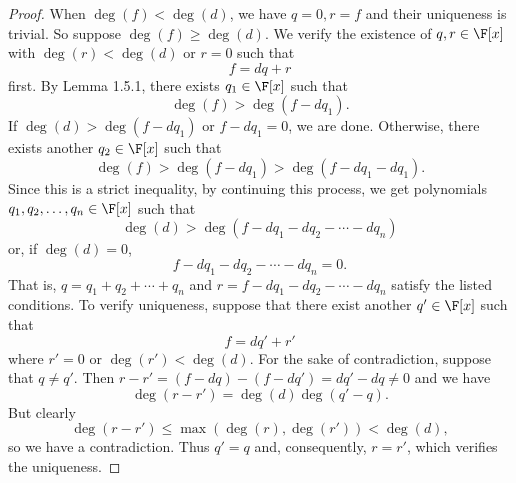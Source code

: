 \documentclass[linearalgebraII]{subfiles}
\begin{document}
    \begin{proof}
        When $\deg(f) < \deg(d)$, we have $q=0, r=f$ and their uniqueness is trivial. So suppose $\deg(f)\geq\deg(d)$. We verify the existence of $q, r\in \F[x]$ with $\deg(r)<\deg(d)$ or $r=0$ such that
        \begin{equation*}
            f = dq+r
        \end{equation*}
        first. By Lemma 1.5.1, there exists $q_1\in \F[x]$ such that
        \begin{equation*}
            \deg(f) > \deg(f-dq_1).
        \end{equation*}
        If $\deg(d) > \deg(f-dq_1)$ or $f-dq_1 = 0$, we are done. Otherwise, there exists another $q_2\in \F[x]$ such that
        \begin{equation*}
            \deg(f) > \deg(f-dq_1) > \deg(f-dq_1-dq_1).
        \end{equation*}
        Since this is a strict inequality, by continuing this process, we get polynomials $q_1, q_2, \ldots, q_n\in \F[x]$ such that
        \begin{equation*}
            \deg(d) > \deg(f-dq_1-dq_2-\cdots-dq_n)
        \end{equation*}
        or, if $\deg(d) = 0$,
        \begin{equation*}
            f - dq_1 - dq_2 - \cdots - dq_n = 0.
        \end{equation*}
        That is, $q = q_1+q_2+\cdots+q_n$ and $r = f-dq_1-dq_2-\cdots-dq_n$ satisfy the listed conditions. To verify uniqueness, suppose that there exist another $q'\in \F[x]$ such that
        \begin{equation*}
            f = dq'+r'
        \end{equation*}
        where $r' = 0$ or $\deg(r')<\deg(d)$. For the sake of contradiction, suppose that $q\neq q'$. Then $r-r' = (f-dq)-(f-dq') = dq'-dq \neq 0$ and we have
        \begin{equation*}
            \deg(r-r') = \deg(d)\deg(q'-q).
        \end{equation*}
        But clearly
        \begin{equation*}
            \deg(r-r') \leq \max(\deg(r), \deg(r')) < \deg(d),
        \end{equation*}
        so we have a contradiction. Thus $q'=q$ and, consequently, $r=r'$, which verifies the uniqueness.
    \end{proof}
\end{document}
